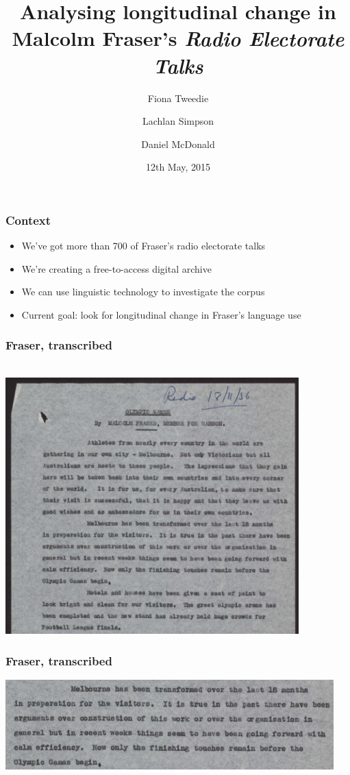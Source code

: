 \documentclass{beamer}       %
\title[\emph{ResPlat}, University of Melbourne]{Analysing longitudinal change in Malcolm Fraser's \emph{Radio Electorate Talks}}
\author[Tweedie, McDonald, Simpson]{Fiona Tweedie \and Lachlan Simpson \and Daniel McDonald}
\date{12th May, 2015}
\begin{document}


\frame{\titlepage}

\begin{frame}
	\frametitle{Context}
	\begin{itemize}
	\item We've got more than 700 of Fraser's radio electorate talks
	\item We're creating a free-to-access digital archive
	\item We can use linguistic technology to investigate the corpus
	\item Current goal: look for longitudinal change in Fraser's language use
	\end{itemize}
\end{frame}

\begin{frame}
    \frametitle{Fraser, transcribed}
    \centering ~ \\
    \includegraphics[width=0.85\textwidth]{images/mf-olympics}
\end{frame}

\begin{frame}
    \frametitle{Fraser, transcribed}
    \centering
    \includegraphics[width=0.95\textwidth]{images/mf-melbourne}
\end{frame}
\end{document}
